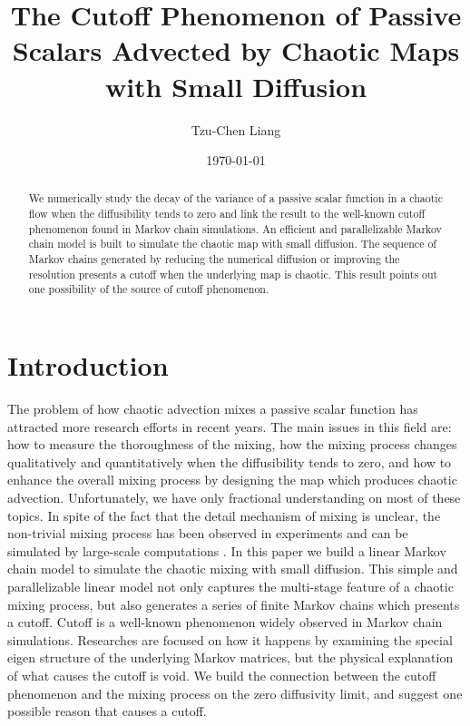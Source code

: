 \documentclass{article}
\title{The Cutoff Phenomenon of Passive Scalars Advected by Chaotic Maps with Small Diffusion }
\author{Tzu-Chen Liang}
\date{\today}
\begin{document}
\maketitle

\begin{abstract}

We numerically study the decay of the variance of a passive scalar function in a chaotic flow when the diffusibility tends to zero and link the result to the well-known cutoff phenomenon found in Markov chain simulations. An efficient and parallelizable Markov chain model is built to simulate the chaotic map with small diffusion. The sequence of Markov chains generated by reducing the numerical diffusion or improving the resolution presents a cutoff when the underlying map is chaotic. This result points out one possibility of the source of cutoff phenomenon. 



\end{abstract}

\section{Introduction}
\label{Introduction}
The problem of how chaotic advection mixes a passive scalar function has attracted more research efforts in recent years\cite{Ottino2004}. The main issues in this field are: how to measure the thoroughness of the mixing, how the mixing process changes qualitatively and quantitatively when the diffusibility tends to zero, and how to enhance the overall mixing process by designing the map which produces chaotic advection. Unfortunately, we have only fractional understanding on most of these topics. In spite of the fact that the detail mechanism of mixing is unclear, the non-trivial mixing process has been observed in experiments \cite{Rothstein1999}\cite{Voth2002} and can be simulated by large-scale computations \cite{Tsang2005}. In this paper we build a linear Markov chain model to simulate the chaotic mixing with small diffusion. This simple and parallelizable linear model not only  captures the multi-stage feature of a chaotic mixing process, but also generates a series of finite Markov chains which presents a cutoff. Cutoff is a well-known phenomenon widely observed in Markov chain simulations\cite{Diaconis1996}\cite{Diaconis2005}\cite{Diaconis1986}\cite{Diaconis1990}. Researches are focused on how it happens by examining the special eigen structure of the underlying Markov matrices, but the physical explanation of what causes the cutoff is void. We build the connection between the cutoff phenomenon and the mixing process on the zero diffusivity limit, and suggest one possible reason that causes a cutoff.
\end{document}
